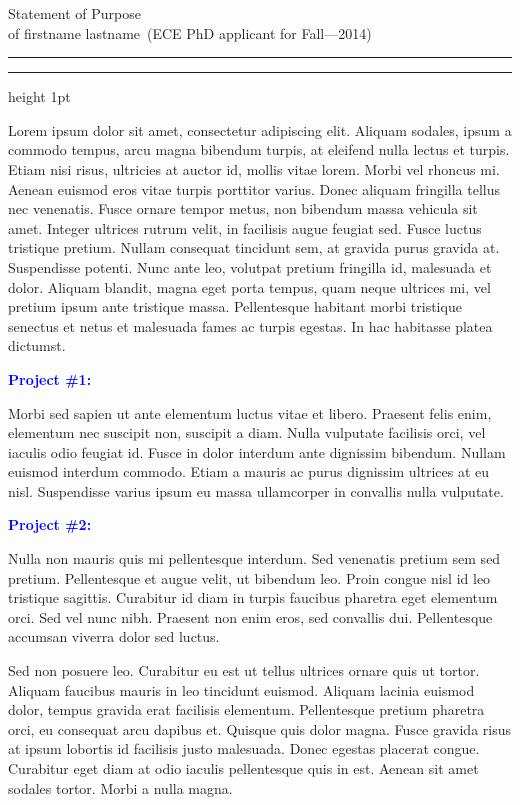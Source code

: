 \documentclass{article}
\newcommand{\soptitle}{Statement of Purpose}
\newcommand{\yourname}{firstname lastname}
\newcommand{\statement}[1]{\par\medskip
  \textcolor{blue}{\textbf{#1:}}\space
}
\begin{document}
\begin{center}\LARGE\soptitle\\
\large of \yourname\ (ECE PhD applicant for Fall---2014)
\end{center}

\hrule
\vspace{1pt}
\hrule height 1pt

\bigskip

Lorem ipsum dolor sit amet, consectetur adipiscing elit. Aliquam
sodales, ipsum a commodo tempus, arcu magna bibendum turpis, at
eleifend nulla lectus et turpis. Etiam nisi risus, ultricies at auctor
id, mollis vitae lorem. Morbi vel rhoncus mi. Aenean euismod eros
vitae turpis porttitor varius. Donec aliquam fringilla tellus nec
venenatis. Fusce ornare tempor metus, non bibendum massa vehicula sit
amet. Integer ultrices rutrum velit, in facilisis augue feugiat sed.
Fusce luctus tristique pretium. Nullam consequat tincidunt sem, at
gravida purus gravida at. Suspendisse potenti. Nunc ante leo, volutpat
pretium fringilla id, malesuada et dolor. Aliquam blandit, magna eget
porta tempus, quam neque ultrices mi, vel pretium ipsum ante tristique
massa. Pellentesque habitant morbi tristique senectus et netus et
malesuada fames ac turpis egestas. In hac habitasse platea dictumst.

\statement{Project \#1}
Morbi sed sapien ut ante elementum \citep{belkin2002using} luctus vitae et libero. Praesent
felis enim, elementum nec suscipit non, suscipit a diam. Nulla
vulputate facilisis orci, vel iaculis odio feugiat id. Fusce in dolor
interdum ante dignissim bibendum. Nullam euismod interdum commodo.
Etiam a mauris ac purus dignissim ultrices at eu nisl. Suspendisse
varius ipsum eu massa ullamcorper in convallis nulla vulputate.

\statement{Project \#2}
Nulla non mauris quis mi pellentesque interdum. Sed venenatis pretium
sem sed pretium. Pellentesque \citep{berard1994embedding} et augue velit, ut bibendum leo. Proin
congue nisl id leo tristique sagittis. Curabitur id diam in turpis
faucibus pharetra eget elementum orci. Sed vel nunc nibh. Praesent non
enim eros, sed convallis dui. Pellentesque accumsan viverra dolor sed
luctus.

Sed non posuere leo. Curabitur eu est ut tellus ultrices ornare quis
ut tortor. Aliquam faucibus mauris in leo tincidunt euismod. Aliquam
lacinia euismod dolor, tempus gravida erat facilisis elementum.
Pellentesque pretium pharetra orci, eu consequat arcu dapibus et.
Quisque quis dolor magna. Fusce gravida risus at ipsum lobortis id
facilisis justo malesuada. Donec egestas placerat congue. Curabitur
eget diam at odio iaculis pellentesque quis in est. Aenean sit amet
sodales tortor. Morbi a nulla magna.
\end{document}
